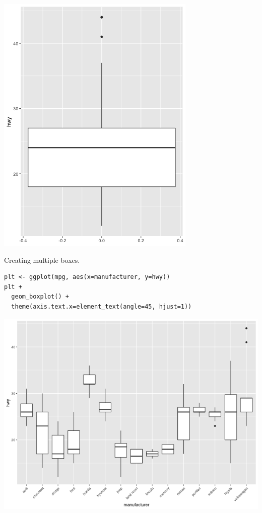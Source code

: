 \documentclass[11pt]{article}
\begin{document}
\begin{org}
\begin{center}
\includegraphics[width=.9\linewidth]{./resources/mpg_box1.png}
\end{center}
\end{org}

Creating multiple boxes.

\begin{verbatim}
plt <- ggplot(mpg, aes(x=manufacturer, y=hwy))
plt +
  geom_boxplot() +
  theme(axis.text.x=element_text(angle=45, hjust=1))
\end{verbatim}

\begin{org}
\begin{center}
\includegraphics[width=.9\linewidth]{./resources/mpg_box2.png}
\end{center}
\end{org}
\end{document}
